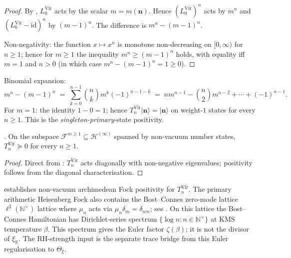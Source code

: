 \begin{proof}
By , \(L_{0}^{\mathrm{Vir}}\) acts
by the scalar \(m=m(\mathbf{n})\). Hence \((L_{0}^{\mathrm{Vir}})^{n}\)
acts by \(m^{n}\) and \((L_{0}^{\mathrm{Vir}}-\mathrm{id})^{n}\) by
\((m-1)^{n}\). The difference is \(m^{n}-(m-1)^{n}\).

Non-negativity: the function \(x\mapsto x^{n}\) is monotone
non-decreasing on \([0,\infty)\) for \(n\geq 1\); hence for \(m\geq 1\) the
inequality \(m^{n}\geq (m-1)^{n}\) holds, with equality iff \(m=1\) and
\(n>0\) (in which case \(m^{n}-(m-1)^{n}=1\geq 0\)).
\end{proof}

\begin{remark}
\label{v4-arith:vb:rem:combinatorial-expansion}
Binomial expansion:
\begin{equation}
m^{n}-(m-1)^{n}\;=\;\sum_{k=0}^{n-1}\binom{n}{k}m^{k}(-1)^{n-1-k}\;=\;nm^{n-1}-\binom{n}{2}m^{n-2}+\cdots+(-1)^{n-1}.
\end{equation}
For \(m=1\): the identity \(1-0=1\); hence
\(T_{n}^{\mathrm{Vir}}|\mathbf{n}\rangle=|\mathbf{n}\rangle\)
on weight-\(1\) states for every \(n\geq 1\). This is the
\emph{singleton-primary}-state positivity.
\end{remark}

\begin{corollary}
\label{v4-arith:vb:cor:fock-restricted-positivity}
\ClaimStatusProvedHere. On the subspace
\(\mathcal{F}^{m\geq 1}\subseteq\mathcal{H}^{(\infty)}\) spanned by
non-vacuum number states, \(T_{n}^{\mathrm{Vir}}\succeq 0\) for every \(n\geq 1\).
\end{corollary}

\begin{proof}
Direct from :
\(T_{n}^{\mathrm{Vir}}\) acts diagonally with non-negative eigenvalues; positivity
follows from the diagonal characterisation.
\end{proof}

\begin{remark}
\label{v4-arith:vb:rem:fock-closed-not}
 establishes
non-vacuum archimedean Fock positivity for \(T_{n}^{\mathrm{Vir}}\).
The primary arithmetic Heisenberg Fock also contains the
Bost--Connes zero-mode lattice
\(\ell^{2}(\mathbb{N}^{\times})\)
lattice where \(\mu_{n}\) acts via
\(\mu_{n}\delta_{m}=\delta_{nm}\); see
. On this lattice the Bost--Connes
Hamiltonian has Dirichlet-series spectrum
\(\{\log n\colon n\in\mathbb{N}^{\times}\}\) at KMS temperature
\(\beta\). This spectrum gives the Euler factor
\(\zeta(\beta)\); it is not the divisor of
\(\xi_{\mathbb R}\).
The RH-strength input is the separate trace bridge from this Euler
regularisation to \(\Theta_{\xi}\).
\end{remark}

